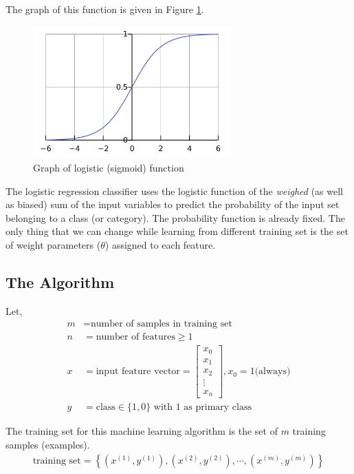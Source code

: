 The graph of this function is given in Figure \ref{fig:sigmoid}.
\begin{figure}[h!]\centering
  \includegraphics[width=3in]{fig/sigmoid}
  \caption{Graph of logistic (sigmoid) function}\label{fig:sigmoid}
\end{figure}

The logistic regression classifier uses the logistic function of the {\em weighed}
(as well as biased) sum of the input variables to predict the probability of
the input set belonging to a class (or category). The probability function is
already fixed. The only thing that we can change while learning from different
training set is the set of weight parameters ($\theta$) assigned to each feature.

\subsection{The Algorithm}

Let,
\begin{align}
  m &= \text{number of samples in training set}
  \nonumber\\
  n &= \text{number of features} \ge 1
  \nonumber\\
  x &= \text{input feature vector} =
  \begin{bmatrix}
  x_0 \\ x_1 \\ x_2 \\ \vdots \\ x_n
  \end{bmatrix}, x_0 = 1 \text{(always)}
  \nonumber\\
  y &= \text{class} \in \{ 1, 0 \} \text{ with 1 as primary class}
  \nonumber
\end{align}

The training set for this machine learning algorithm is the set of $m$ training
samples (examples).
\begin{align}
  \text{training set} = 
  \left\{ (x^{(1)}, y^{(1)}), (x^{(2)}, y^{(2)}), \cdots , (x^{(m)}, y^{(m)}) \right\}
  \label{eqn:training-set}
\end{align}

